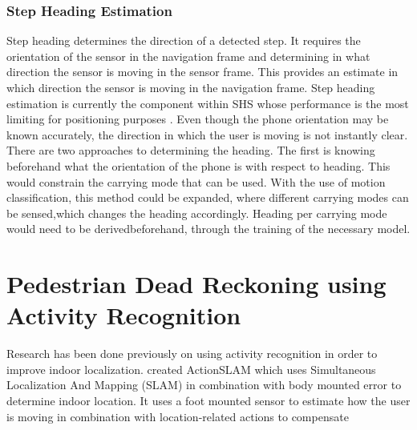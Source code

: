 \subsubsection{Step Heading Estimation}
Step heading determines the direction of a detected step. It requires the orientation of the sensor in the navigation frame and determining in what direction the sensor is moving in the sensor frame. This provides an estimate in which direction the sensor is moving in the navigation frame.  Step heading estimation is currently the component within SHS whose performance is the most limiting for positioning purposes \cite{Diez2018b, Qian2013,Combettes2017}.
Even though the phone orientation may be known accurately, the direction in which the user is moving is not instantly clear. There are two approaches to determining the heading. The first is knowing beforehand what the orientation of the phone is with respect to heading.  This would constrain the carrying mode that can be used.  With the use of motion classification, this method could be expanded, where different carrying modes can be sensed,which changes the heading accordingly. Heading per carrying mode would need to be derivedbeforehand, through the training of the necessary model. 

\section{Pedestrian Dead Reckoning using Activity Recognition}
Research has been done previously on using activity recognition in order to improve indoor localization. \citet{Hardegger2012} created ActionSLAM which uses Simultaneous Localization And Mapping (SLAM) in combination with body mounted error to determine indoor location. It uses a foot mounted sensor to estimate how the user is moving in combination with location-related actions to compensate 



